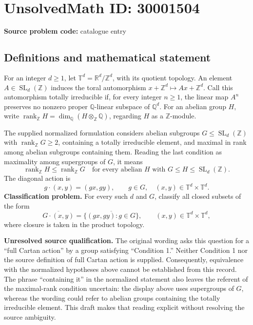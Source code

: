 \documentclass[11pt]{article}
\begin{document}
\section*{UnsolvedMath ID: 30001504}
\textbf{Source problem code:} catalogue entry
\subsection{Definitions and mathematical statement}
For an integer \(d\geq 1\), let \(\mathbb T^d=\mathbb R^d/\mathbb Z^d\), with its quotient topology. An element \(A\in\operatorname{SL}_d(\mathbb Z)\) induces the toral automorphism \(x+\mathbb Z^d\mapsto Ax+\mathbb Z^d\). Call this automorphism totally irreducible if, for every integer \(n\geq 1\), the linear map \(A^n\) preserves no nonzero proper \(\mathbb Q\)-linear subspace of \(\mathbb Q^d\). For an abelian group \(H\), write \(\operatorname{rank}_{\mathbb Z}H=\dim_{\mathbb Q}(H\otimes_{\mathbb Z}\mathbb Q)\), regarding \(H\) as a \(\mathbb Z\)-module.

The supplied normalized formulation considers abelian subgroups \(G\leq\operatorname{SL}_d(\mathbb Z)\) with \(\operatorname{rank}_{\mathbb Z}G\geq 2\), containing a totally irreducible element, and maximal in rank among abelian subgroups containing them. Reading the last condition as maximality among supergroups of \(G\), it means
\[
\operatorname{rank}_{\mathbb Z}H\leq\operatorname{rank}_{\mathbb Z}G
\quad\text{for every abelian }H\text{ with }G\leq H\leq\operatorname{SL}_d(\mathbb Z).
\]
The diagonal action is
\[
g\cdot(x,y)=(gx,gy),\qquad g\in G,\quad (x,y)\in\mathbb T^d\times\mathbb T^d.
\]
\textbf{Classification problem.} For every such \(d\) and \(G\), classify all closed subsets of the form
\[
\overline{G\cdot(x,y)}
=\overline{\{(gx,gy):g\in G\}},
\qquad (x,y)\in\mathbb T^d\times\mathbb T^d,
\]
where closure is taken in the product topology.

\textbf{Unresolved source qualification.} The original wording asks this question for a ``full Cartan action'' by a group satisfying ``Condition 1.'' Neither Condition 1 nor the source definition of full Cartan action is supplied. Consequently, equivalence with the normalized hypotheses above cannot be established from this record. The phrase ``containing it'' in the normalized statement also leaves the referent of the maximal-rank condition uncertain: the display above uses supergroups of \(G\), whereas the wording could refer to abelian groups containing the totally irreducible element. This draft makes that reading explicit without resolving the source ambiguity.
\end{document}
